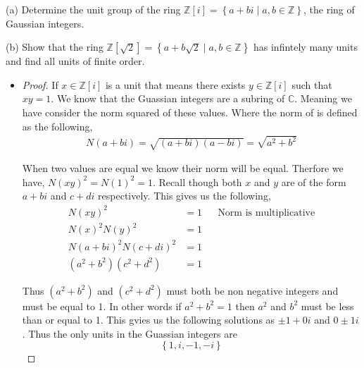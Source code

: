 \documentclass[11pt]{article}
\newenvironment{problem}[2][Problem\!]{\begin{trivlist}
\item[\hskip \labelsep {\bfseries #1}\hskip \labelsep {\bfseries #2}]}{\end{trivlist}}
\newcommand{\zz}{\mathbb Z}   %
\newcommand{\cc}{\mathbb C}   %
\newcommand{\set}[1]{\left\{#1\right\}} %
\begin{document}
\newpage 
\begin{tcolorbox}
  \begin{problem} {9.1} (a) Determine the unit group of the ring $\zz[i] = \set{a + bi \mid a,b \in \zz}$, the ring of Gaussian integers.
    
    (b) Show that the ring $\zz[\sqrt{2}] = \set{a + b \sqrt{2} \mid a,b \in \zz}$ has infintely many units and find all units of finite order. 
  \end{problem}
\end{tcolorbox}
\begin{itemize}
    \item[(a)]
    \begin{proof}
        If $x \in \zz[i]$ is a unit that means there exists $y\in \zz[i]$ such that $xy = 1$. We know that the Guassian integers are a subring of $\cc$. Meaning we have consider the norm squared of these values. Where the norm of is defined as the following,
        \begin{align*}
            N(a + bi) = \sqrt{(a +bi)(a-bi)} = \sqrt{a^{2} + b^{2}}
        \end{align*}

        When two values are equal we know their norm will be equal. Therfore we have, $N(xy)^{2} = N(1)^{2} = 1$. Recall though both $x$ and $y$ are of the form $a + bi$ and $c + di$ respectively. This gives us the following,
        \begin{align*}
            N(xy)^{2} &= 1  && \text{Norm is multiplicative}\\
            N(x)^{2}N(y)^{2} &= 1 \\
            N(a+bi)^{2}N(c + di)^{2} &= 1 \\
            (a^{2} + b^{2})(c^{2} + d^{2}) &= 1
        \end{align*}

        Thus $(a^{2} + b^{2})$ and $(c^{2} + d^{2})$ must both be non negative integers and must be equal to 1. In other words if $a^{2} + b^{2} =1$ then $a^{2}$ and $b^{2}$ must be less than or equal to 1. This gvies us the following solutions as $\pm1 + 0i$ and $0 \pm 1i$. Thus the only units in the Guassian integers are \[\set{1, i , -1, -i}\]
 

\end{proof}
\end{itemize}
\end{document}
